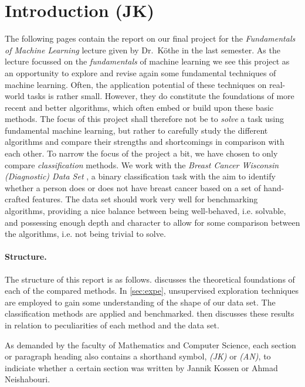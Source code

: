 \documentclass[11pt, a4paper]{scrartcl}
\begin{document}
\section{Introduction (JK)}
The following pages contain the report on our final project for the \emph{Fundamentals of Machine Learning} lecture given by Dr.\ Köthe in the last semester. As the lecture focussed on the \emph{fundamentals} of machine learning we see this project as an opportunity to explore and revise again some fundamental techniques of machine learning. Often, the application potential of these techniques on real-world tasks is rather small. However, they do constitute the foundations of more recent and better algorithms, which often embed or build upon these basic methods. 
The focus of this project shall therefore not be to \emph{solve} a task using fundamental machine learning, but rather to carefully study the different algorithms and compare their strengths and shortcomings in comparison with each other. To narrow the focus of the project a bit, we have chosen to only compare \emph{classification} methods.
We work with the \emph{Breast Cancer Wisconsin (Diagnostic) Data Set} \cite{street1993nuclear}, a binary classification task with the aim to identify whether a person does or does not have breast cancer based on a set of hand-crafted features. The data set should work very well for benchmarking algorithms, providing a nice balance between being well-behaved, i.e. solvable, and possessing enough depth and character to allow for some comparison between the algorithms, i.e. not being trivial to solve.

\paragraph{Structure.} The structure of this report is as follows.  discusses the theoretical foundations of each of the compared methods. In \cref{sec:expe}, unsupervised exploration techniques are employed to gain some understanding of the shape of our data set. The classification methods are applied and benchmarked.  then discusses these results in relation to peculiarities of each method and the data set.

As demanded by the faculty of Mathematics and Computer Science, each section or paragraph heading also contains a shorthand symbol, \emph{(JK)} or \emph{(AN)}, to indiciate whether a certain section was written by Jannik Kossen or Ahmad Neishabouri.

\end{document}
